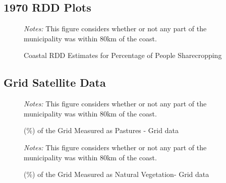\documentclass{article}
\begin{document}
\subsection*{1970 RDD Plots}

\begin{figure}[h!]
  \caption{Coastal RDD Estimates for Percentage of People Sharecropping}
  \begin{center}
  \textit{Notes:} This figure considers whether or not any part of the municipality was within 80km of the coast.
  \end{center}
  \label{fig:1970_RDD_Sharecropping}
\end{figure}

\clearpage

\subsection*{Grid Satellite Data}

\begin{figure}[h!]
  \caption{(\%) of the Grid Measured as Pastures - Grid data}
  \begin{center}
  \textit{Notes:} This figure considers whether or not any part of the municipality was within 80km of the coast.
  \end{center}
  \label{fig:pasture_grid}
\end{figure}

\begin{figure}
  \caption{(\%) of the Grid Measured as Natural Vegetation- Grid data}
  \begin{center}
  \textit{Notes:} This figure considers whether or not any part of the municipality was within 80km of the coast.
  \end{center}
  \label{fig:natural_grid}
\end{figure}
\end{document}
